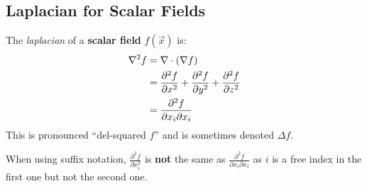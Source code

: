 \documentclass[../main.tex]{subfiles}
\begin{document}
\subsection{Laplacian for Scalar Fields}
\begin{definition}
  The \textit{laplacian} of a \textbf{scalar field} $f(\vec{x})$ is:
  \begin{align*}
    \nabla^2 f &= \nabla \cdot (\nabla f)  \\
               &= \pderiv[2]{f}{x} + \pderiv[2]{f}{y} + \pderiv[2]{f}{z} \\
               &= \frac{\partial^2 f}{\partial x_i \partial x_i}
  \end{align*}
  This is pronounced ``del-squared $f$'' and is sometimes denoted $\Delta f$.
\end{definition}
\begin{remark}[Note]
  When using suffix notation, $\frac{\partial^2 f}{\partial x^2_i}$ is \textbf{not} the same as $\frac{\partial^2 f}{\partial x_i \partial x_i}$ as $i$ is a free index in the first one but not the second one.
\end{remark}
\end{document}
